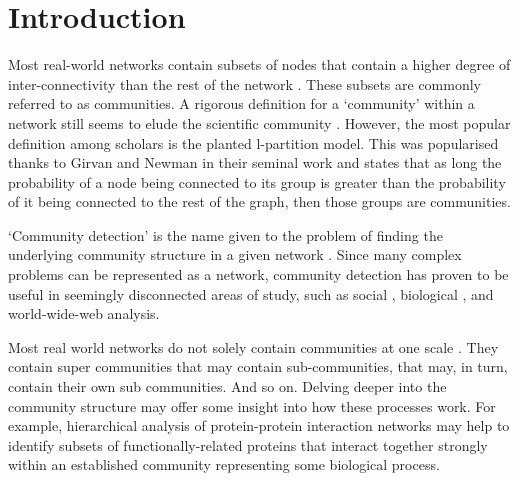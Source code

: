 \documentclass{article}
\begin{document}
\section{Introduction}
Most real-world networks contain subsets of nodes that contain a higher degree of inter-connectivity than the rest of the network
\cite{lancichinetti2009detecting}.
These subsets are commonly referred to as communities. 
A rigorous definition for a `community' within a network still seems to elude the scientific community \cite{lancichinetti2009detecting}.
However, the most popular definition among scholars is the planted l-partition model. 
This was popularised thanks to Girvan and Newman in their seminal work \cite{girvan2002community} and states that as long the probability of a node being connected to its group is greater than the probability of it being connected to the rest of the graph, then those groups are communities. 

`Community detection' is the name given to the problem of finding the underlying community structure in a given network \cite{girvan2002community}. 
Since many complex problems can be represented as a network, community detection has proven to be useful in seemingly disconnected areas of study, such as social \cite{barber2007modularity}, biological \cite{fortunato2007resolution}, and world-wide-web \cite{danon2006effect} analysis.

Most real world networks do not solely contain communities at one scale \cite{lancichinetti2009detecting,yang2013hierarchical}. 
They contain super communities that may contain sub-communities, that may, in turn, contain their own sub communities.
And so on. 
Delving deeper into the community structure may offer some insight into how these processes work.
For example, hierarchical analysis of protein-protein interaction networks may help to identify subsets of functionally-related proteins that interact together strongly within an established community representing some biological process.
\end{document}
